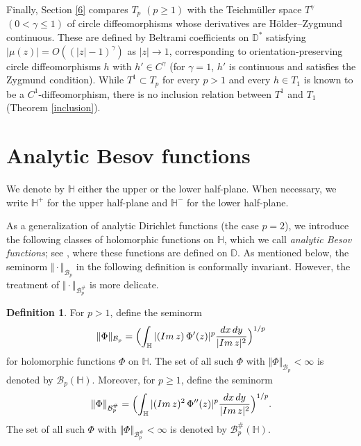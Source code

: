 \documentclass[amstex,12pt,reqno]{amsart}
\theoremstyle{definition}
\newtheorem{definition}{Definition}
\begin{document}
Finally, Section \ref{6} compares $T_p$ $(p \geq 1)$ with the Teichm\"uller space $T^\gamma$ $(0<\gamma\leq 1)$ of circle diffeomorphisms whose derivatives are H\"older--Zygmund continuous.
These are 
defined by Beltrami coefficients on $\mathbb D^*$ satisfying $|\mu(z)|=O((|z|-1)^\gamma)$ as $|z|\to1$, corresponding to orientation-preserving circle diffeomorphisms $h$ with $h'\in C^{\gamma}$ (for $\gamma=1$, $h'$ is continuous and satisfies the Zygmund condition). While $T^1\subset T_p$ for every $p>1$ and every $h\in T_1$ is known to be a $C^1$-diffeomorphism, there is no inclusion relation between $T^1$ and $T_1$ (Theorem \ref{inclusion}).





\section{Analytic Besov functions}\label{2}

We denote by $\mathbb H$ either the upper or the lower half-plane. When necessary, we write $\mathbb H^+$ for the upper half-plane and $\mathbb H^-$ for the lower half-plane.

As a generalization of analytic Dirichlet functions (the case $p=2$),
we introduce the following classes of holomorphic functions on $\mathbb H$, which we call
{\it analytic Besov functions}; see \cite[Chapter~5]{Zhu}, where these functions are defined on $\mathbb D$.
As mentioned below, the seminorm $\Vert \cdot \Vert_{\mathcal B_p}$ in the following definition is conformally invariant.
However, the treatment of $\Vert \cdot \Vert_{\mathcal B_p^\#}$ is more delicate.

\begin{definition}
For $p>1$, define the seminorm
$$
\Vert \Phi\Vert_{{\mathcal B}_p}=\Bigl(\int_{\mathbb H} |({\rm Im}\,z)\, \Phi'(z)|^p \frac{dx\,dy}{|{\rm Im}\,z|^2}\Bigr)^{1/p}
$$
for holomorphic functions $\Phi$ on $\mathbb H$. The set 
of all such $\Phi$ with $\Vert \Phi\Vert_{{\mathcal B}_p}<\infty$
is denoted by ${\mathcal B}_p(\mathbb H)$. 
Moreover, for $p \geq 1$, define the seminorm
$$
\Vert \Phi \Vert_{{\mathcal B}_p^{\#}}=\Bigl(\int_{\mathbb H} |({\rm Im}\,z)^2\, \Phi''(z)|^p \frac{dx\,dy}{|{\rm Im}\,z|^2}\Bigr)^{1/p}. 
$$
The set of all such $\Phi$ with $\Vert \Phi\Vert_{{\mathcal B}_p^{\#}}<\infty$
is denoted by ${\mathcal B}_p^{\#}(\mathbb H)$. 
\end{definition}
\end{document}

